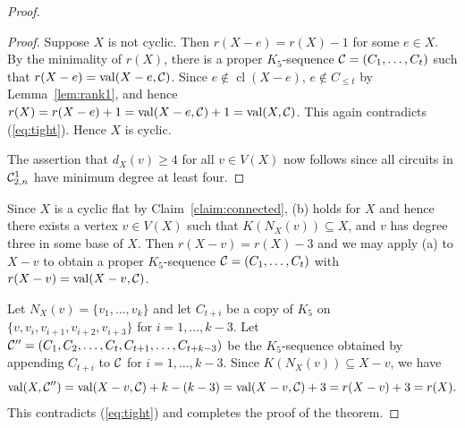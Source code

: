 \documentclass{daj}
\DeclareMathOperator{\cl}{cl}
\begin{document}
\begin{proof}
\begin{proof}
Suppose $X$ is not cyclic. Then $r(X-e)=r(X)-1$ for some $e\in X$. By  the minimality of $r(X)$, there is a proper $K_5$-sequence ${\cal C}=(C_{1},\dots, C_{t})$ such that
$r(X-e)={\rm val}(X-e, {\cal C})$. Since $e\not\in \cl(X-e)$, $e\not\in C_{\leq t}$ by 
Lemma~\ref{lem:rank1}, and hence $r(X)=r(X-e)+1={\rm val}(X-e, {\cal C})+1={\rm val}(X, {\cal C})$. This again contradicts  (\ref{eq:tight}).  Hence $X$ is cyclic.
%
%
%
%

The assertion that $d_X(v)\geq 4$ for all $v\in V(X)$ now follows since all circuits in ${\cal C}_{2,n}^1$ have minimum degree at least four.
 \end{proof}

Since $X$ is a cyclic flat by Claim~\ref{claim:connected}, (b) holds for $X$ and hence there exists a vertex $v\in V(X)$ such that $K(N_X(v))\subseteq X$, and $v$ has degree three in some base of $X$. Then $r(X-v)=r(X)-3$ and we may apply (a) to $X-v$ to obtain a proper $K_5$-sequence ${\cal C}=(C_1,\dots, C_t)$ with $r(X-v)={\rm val}(X-v, {\cal C})$.




Let $N_X(v)=\{v_1,\dots, v_k\}$ and let $C_{t+i}$ be a copy  of $K_5$ on $\{v, v_i, v_{i+1}, v_{i+2}, v_{i+3}\}$ for $i=1, \dots, k-3$.
Let
${\cal C}''=(C_1,C_2,\ldots,C_t,C_{t+1},\ldots, C_{t+k-3})$ be the  $K_5$-sequence obtained by
appending $C_{t+i}$ to $\cal C$ for $i=1, \dots, k-3$.
Since $K(N_X(v))\subseteq  
X-v$, we have 
$${\rm val}(X,{\cal C}'')={\rm val}(X-v,{\cal C})+k-(k-3)={\rm val}(X-v,{\cal C})+3
=r(X-v)+3=r(X).$$
This contradicts (\ref{eq:tight}) and completes the proof of the theorem.
\end{proof}
\end{document}
